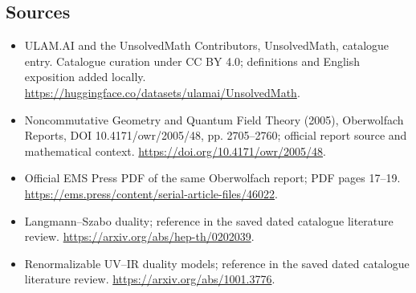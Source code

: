 \documentclass[11pt]{article}
\begin{document}
\subsection{Sources}
\begin{itemize}
\item[\hypertarget{source:statement:1}{S1}] ULAM.AI and the UnsolvedMath Contributors, UnsolvedMath, catalogue entry. Catalogue curation under CC BY 4.0; definitions and English exposition added locally.
\url{https://huggingface.co/datasets/ulamai/UnsolvedMath}.
\item[\hypertarget{source:statement:2}{S2}] Noncommutative Geometry and Quantum Field Theory (2005), Oberwolfach Reports, DOI 10.4171/owr/2005/48, pp. 2705--2760; official report source and mathematical context.
\url{https://doi.org/10.4171/owr/2005/48}.
\item[\hypertarget{source:statement:3}{S3}] Official EMS Press PDF of the same Oberwolfach report; PDF pages 17--19.
\url{https://ems.press/content/serial-article-files/46022}.
\item[\hypertarget{source:statement:4}{S4}] Langmann--Szabo duality; reference in the saved dated catalogue literature review.
\url{https://arxiv.org/abs/hep-th/0202039}.
\item[\hypertarget{source:statement:5}{S5}] Renormalizable UV--IR duality models; reference in the saved dated catalogue literature review.
\url{https://arxiv.org/abs/1001.3776}.
\end{itemize}
\label{end:statement}
\end{document}

